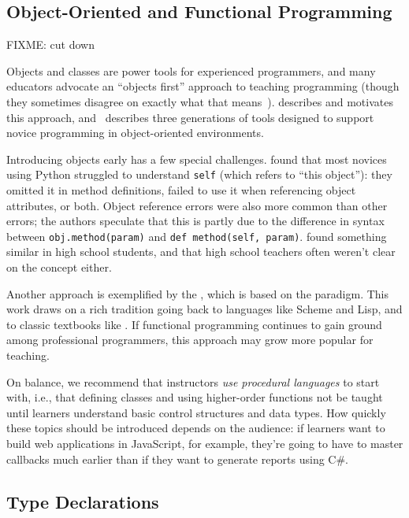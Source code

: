 \subsection*{Object-Oriented and Functional Programming}

FIXME: cut down

Objects and classes are power tools for experienced programmers, and many educators advocate an ``objects first'' approach to teaching programming (though they sometimes disagree on exactly what that means~\cite{Benn2007b}). \cite{Sorv2014} describes and motivates this approach, and~\cite{Koll2015} describes three generations of tools designed to support novice programming in object-oriented environments.

Introducing objects early has a few special challenges. \cite{Mill2016b} found that most novices using Python struggled to understand \texttt{self} (which refers to ``this object''): they omitted it in method definitions, failed to use it when referencing object attributes, or both. Object reference errors were also more common than other errors; the authors speculate that this is partly due to the difference in syntax between \texttt{obj.method(param)} and \texttt{def\ method(self,\ param)}. \cite{Rago2017} found something similar in high school students, and that high school teachers often weren't clear on the concept either.

Another approach is exemplified by the , which is based on the  paradigm. This work draws on a rich tradition going back to languages like Scheme and Lisp, and to classic textbooks like \cite{Fell2001,Frie1995,Abel1996}. If functional programming continues to gain ground among professional programmers, this approach may grow more popular for teaching.

On balance, we recommend that instructors \emph{use procedural languages} to start with, i.e., that defining classes and using higher-order functions not be taught until learners understand basic control structures and data types. How quickly these topics should be introduced depends on the audience: if learners want to build web applications in JavaScript, for example, they're going to have to master callbacks much earlier than if they want to generate reports using C\#.

\subsection*{Type Declarations}

